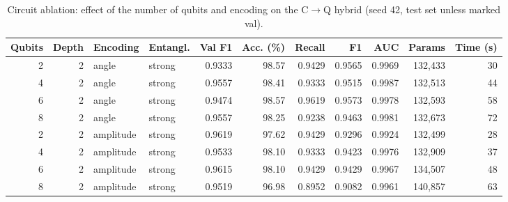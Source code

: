 \begin{table}[htbp]
\centering
\footnotesize
\caption{Circuit ablation: effect of the number of qubits and encoding on the C$\rightarrow$Q hybrid (seed 42, test set unless marked val).}
\label{tab:abl_qubits}
\begin{adjustbox}{max width=\linewidth}
\begin{tabular}{rrllrrrrrrr}
\toprule
Qubits & Depth & Encoding & Entangl. & Val F1 & Acc. (\%) & Recall & F1 & AUC & Params & Time (s) \\
\midrule
2 & 2 & angle & strong & 0.9333 & 98.57 & 0.9429 & 0.9565 & 0.9969 & 132,433 & 30 \\
4 & 2 & angle & strong & 0.9557 & 98.41 & 0.9333 & 0.9515 & 0.9987 & 132,513 & 44 \\
6 & 2 & angle & strong & 0.9474 & 98.57 & 0.9619 & 0.9573 & 0.9978 & 132,593 & 58 \\
8 & 2 & angle & strong & 0.9557 & 98.25 & 0.9238 & 0.9463 & 0.9981 & 132,673 & 72 \\
2 & 2 & amplitude & strong & 0.9619 & 97.62 & 0.9429 & 0.9296 & 0.9924 & 132,499 & 28 \\
4 & 2 & amplitude & strong & 0.9533 & 98.10 & 0.9333 & 0.9423 & 0.9976 & 132,909 & 37 \\
6 & 2 & amplitude & strong & 0.9615 & 98.10 & 0.9429 & 0.9429 & 0.9967 & 134,507 & 48 \\
8 & 2 & amplitude & strong & 0.9519 & 96.98 & 0.8952 & 0.9082 & 0.9961 & 140,857 & 63 \\
\bottomrule
\end{tabular}
\end{adjustbox}
\end{table}
